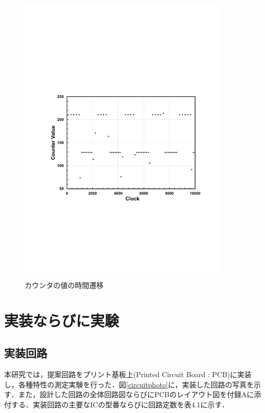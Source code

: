 \begin{figure}[h]
\begin{center}

\includegraphics[width=100mm]{figures/counter.pdf}
\caption{カウンタの値の時間遷移}
\label{counter}

\end{center}
\end{figure}

\section{実装ならびに実験}
\subsection{実装回路}
本研究では，提案回路をプリント基板上(Printed Circuit Board : PCB)に実装し，各種特性の測定実験を行った．図\ref{circuitphoto}に，実装した回路の写真を示す．また，設計した回路の全体回路図ならびにPCBのレイアウト図を付録Aに添付する．実装回路の主要なICの型番ならびに回路定数を表4.1に示す．

